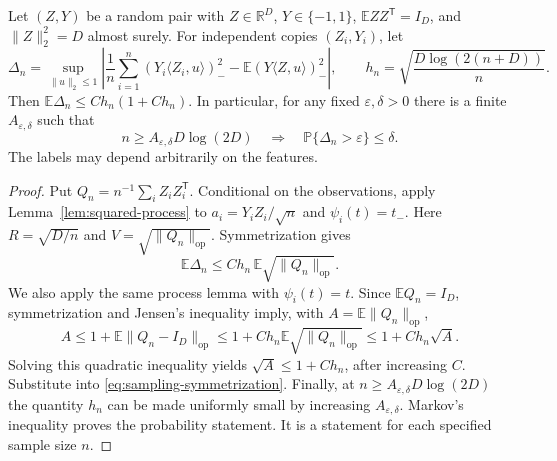 \begin{lemma}
\label{lem:squared-sampling}
Let $(Z,Y)$ be a random pair with $Z\in\mathbb R^D$, $Y\in\{-1,1\}$,
$\mathbb E ZZ^{\mathsf T}=I_D$, and $\|Z\|_2^2=D$ almost surely.
For independent copies $(Z_i,Y_i)$, let
\[
 \Delta_n=\sup_{\|u\|_2\le1}
 \left|\frac1n\sum_{i=1}^n(Y_i\langle Z_i,u\rangle)_-^2
          -\mathbb E(Y\langle Z,u\rangle)_-^2\right|,
 \qquad h_n=\sqrt{\frac{D\log(2(n+D))}{n}}.
\]
Then $\mathbb E\Delta_n\le C h_n(1+C h_n)$.
In particular, for any fixed $\varepsilon,\delta>0$ there is a finite
$A_{\varepsilon,\delta}$ such that
\[
 n\ge A_{\varepsilon,\delta}D\log(2D)
 \quad\Longrightarrow\quad
 \mathbb P\{\Delta_n>\varepsilon\}\le\delta.
\]
The labels may depend arbitrarily on the features.
\end{lemma}

\begin{proof}
Put $Q_n=n^{-1}\sum_iZ_iZ_i^{\mathsf T}$.
Conditional on the observations, apply
Lemma~\ref{lem:squared-process} to
$a_i=Y_iZ_i/\sqrt n$ and $\psi_i(t)=t_-$.
Here $R=\sqrt{D/n}$ and $V=\sqrt{\|Q_n\|_{\mathrm{op}}}$.
Symmetrization gives
\begin{equation}\label{eq:sampling-symmetrization}
 \mathbb E\Delta_n
 \le C h_n\,\mathbb E\sqrt{\|Q_n\|_{\mathrm{op}}}.
\end{equation}
We also apply the same process lemma with $\psi_i(t)=t$.
Since $\mathbb E Q_n=I_D$, symmetrization and Jensen's inequality imply,
with $A=\mathbb E\|Q_n\|_{\mathrm{op}}$,
\[
 A\le1+\mathbb E\|Q_n-I_D\|_{\mathrm{op}}
 \le1+C h_n\mathbb E\sqrt{\|Q_n\|_{\mathrm{op}}}
 \le1+C h_n\sqrt A.
\]
Solving this quadratic inequality yields $\sqrt A\le1+C h_n$,
after increasing $C$. Substitute into
\eqref{eq:sampling-symmetrization}.
Finally, at $n\ge A_{\varepsilon,\delta}D\log(2D)$ the quantity
$h_n$ can be made uniformly small by increasing
$A_{\varepsilon,\delta}$. Markov's inequality proves the probability
statement. It is a statement for each specified sample size $n$.
\end{proof}

